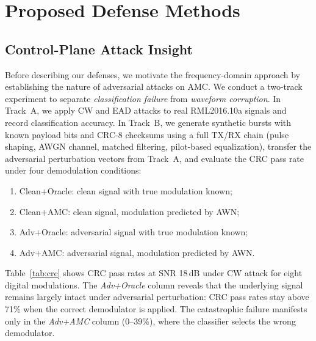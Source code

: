 \chapter{Proposed Defense Methods}
\label{ch:method}

\section{Control-Plane Attack Insight}

Before describing our defenses, we motivate the frequency-domain approach by
establishing the nature of adversarial attacks on AMC. We conduct a two-track
experiment to separate \emph{classification failure} from \emph{waveform
corruption}. In Track~A, we apply CW and EAD attacks to real RML2016.10a
signals and record classification accuracy. In Track~B, we generate synthetic
bursts with known payload bits and CRC-8 checksums using a full TX/RX chain
(pulse shaping, AWGN channel, matched filtering, pilot-based equalization),
transfer the adversarial perturbation vectors from Track~A, and evaluate the
CRC pass rate under four demodulation conditions:

\begin{enumerate}
  \item Clean+Oracle: clean signal with true modulation known;
  \item Clean+AMC: clean signal, modulation predicted by AWN;
  \item Adv+Oracle: adversarial signal with true modulation known;
  \item Adv+AMC: adversarial signal, modulation predicted by AWN.
\end{enumerate}

Table~\ref{tab:crc} shows CRC pass rates at SNR 18\,dB under CW attack for
eight digital modulations. The \emph{Adv+Oracle} column reveals that the
underlying signal remains largely intact under adversarial perturbation:
CRC pass rates stay above 71\% when the correct demodulator is applied. The
catastrophic failure manifests only in the \emph{Adv+AMC} column (0--39\%),
where the classifier selects the wrong demodulator.


